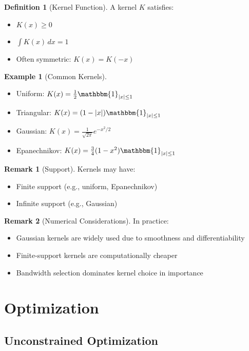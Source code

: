 \documentclass[12pt,oneside]{book}
\numberwithin{equation}{section}
\theoremstyle{definition}
\newtheorem{definition}{Definition}[section]
\newtheorem{example}{Example}[section]
\newtheorem{remark}{Remark}[section]
\theoremstyle{plain}
\theoremstyle{remark}
\newcommand{\ind}{\mathbbm{1}}
\newcommand{\abs}[1]{\left\lvert #1 \right\rvert}
\begin{document}
\begin{definition}[Kernel Function]
A kernel $K$ satisfies:
\begin{itemize}
    \item $K(x) \geq 0$
    \item $\int K(x)\,dx = 1$
    \item Often symmetric: $K(x) = K(-x)$
\end{itemize}
\end{definition}

\begin{example}[Common Kernels]
\begin{itemize}
    \item Uniform: $K(x) = \frac{1}{2}\ind_{\abs{x} \leq 1}$
    \item Triangular: $K(x) = (1-\abs{x})\ind_{\abs{x} \leq 1}$
    \item Gaussian: $K(x) = \frac{1}{\sqrt{2\pi}}e^{-x^2/2}$
    \item Epanechnikov: $K(x) = \frac{3}{4}(1-x^2)\ind_{\abs{x} \leq 1}$
\end{itemize}
\end{example}

\begin{remark}[Support]
Kernels may have:
\begin{itemize}
    \item Finite support (e.g., uniform, Epanechnikov)
    \item Infinite support (e.g., Gaussian)
\end{itemize}
\end{remark}

\begin{remark}[Numerical Considerations]
In practice:
\begin{itemize}
    \item Gaussian kernels are widely used due to smoothness and differentiability
    \item Finite-support kernels are computationally cheaper
    \item Bandwidth selection dominates kernel choice in importance
\end{itemize}
\end{remark}

\chapter{Optimization}

\section{Unconstrained Optimization}
\end{document}
